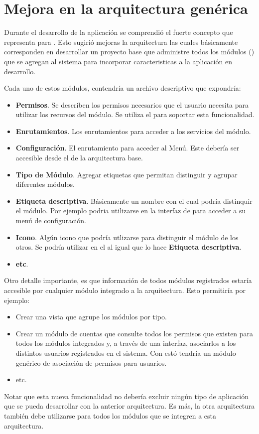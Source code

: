 
\section{Mejora en la arquitectura genérica}
	Durante el desarrollo de la aplicación se comprendió el fuerte concepto que representa \packageAS para \meteorNAME. Esto sugirió mejoras la arquitectura las cuales básicamente corresponden en desarrollar un proyecto base que administre todos los módulos (\packageAS) que se agregan al sistema para incorporar caracteristicas a la aplicación en desarrollo. 

	Cada uno de estos módulos, contendría un archivo descriptivo que expondría:
	\begin{itemize}
		\item
			\textbf{Permisos}. Se describen los permisos necesarios que el usuario necesita para utilizar los recursos del módulo. Se utiliza el \packageAS \alanningRolesPackage para soportar esta funcionalidad.
		\item
			\textbf{Enrutamientos}. Los enrutamientos para acceder a los servicios del módulo.
		\item
			\textbf{Configuración}. El enrutamiento para acceder al Menú. Este debería ser accesible desde el \dashboardEF  de la arquitectura base.
		\item
			\textbf{Tipo de Módulo}. Agregar etiquetas que permitan distinguir y agrupar diferentes módulos.
		\item
			\textbf{Etiqueta descriptiva}. Básicamente un nombre con el cual podría distinquir el módulo. Por ejemplo podria utilizarse en la interfaz de \dashboardEF para acceder a su menú de configuración.
		\item
			\textbf{Icono}. Algún icono que podría utlizarse para distinguir el módulo de los otros. Se podría utilizar en el \dashboardEF al igual que lo hace \textbf{Etiqueta descriptiva}.
		\item
			\textbf{etc}.
	\end{itemize}


	Otro detalle importante, es que información de todos módulos registrados estaría accesible por cualquier módulo integrado a la arquitectura. Esto permitiría por ejemplo:

	\begin{itemize}
		\item
			Crear una vista que agrupe los módulos por tipo.
		\item
			Crear un módulo de cuentas que consulte todos los permisos que existen para todos los módulos integrados y, a través de una interfaz, asociarlos a los distintos usuarios registrados en el sistema. Con estó tendría un módulo genérico de asociación de permisos para usuarios.
		\item
			etc.
	\end{itemize}

	Notar que esta nueva funcionalidad no debería excluir ningún tipo de aplicación que se pueda desarrollar con la anterior arquitectura. Es más, la otra arquitectura también debe utilizarse para todos los módulos que se integren a esta arquitectura.


